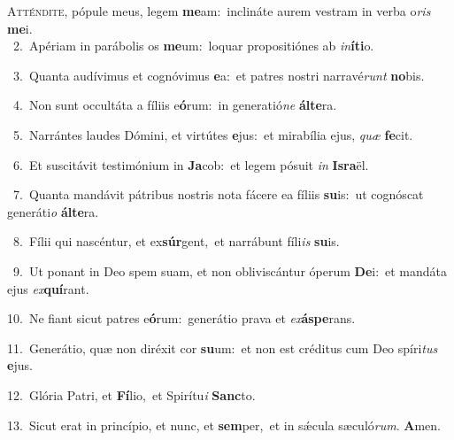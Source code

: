 \lettrine{\initial\textcolor{\initialcolor}{A}}{tténdite,} pópule meus, legem \textbf{me}\-am:~\star inclináte aurem vestram in verba o\textit{ris} \textbf{me}\-i.\\
{\numbfont\textcolor{\numbcolor}{~2.}}~Apériam in parábolis os \textbf{me}\-um:~\star loquar propositiónes ab \textit{in}\-\textbf{í}\textbf{ti}o.\par
{\numbfont\textcolor{\numbcolor}{~3.}}~Quanta audívimus et cognóvimus \textbf{e}\-a:~\star et patres nostri narravé\textit{runt} \textbf{no}\-bis.\par
{\numbfont\textcolor{\numbcolor}{~4.}}~Non sunt occultáta a fíliis e\-\textbf{ó}\-rum:~\star in generatió\textit{ne} \textbf{ál}\-\textbf{te}ra.\par
{\numbfont\textcolor{\numbcolor}{~5.}}~Narrántes laudes Dómini, et virtútes \textbf{e}\-jus:~\star et mirabília ejus, \textit{quæ} \textbf{fe}\-cit.\par
{\numbfont\textcolor{\numbcolor}{~6.}}~Et suscitávit testimónium in \textbf{Ja}\-cob:~\star et legem pósuit \textit{in} \textbf{Is}\-\textbf{ra}ël.\par
{\numbfont\textcolor{\numbcolor}{~7.}}~Quanta mandávit pátribus nostris nota fácere ea fíliis \textbf{su}\-is:~\star ut cognóscat generáti\textit{o} \textbf{ál}\-\textbf{te}ra.\par
{\numbfont\textcolor{\numbcolor}{~8.}}~Fílii qui nascéntur, et ex\-\textbf{súr}\-gent,~\star et narrábunt fíli\textit{is} \textbf{su}\-is.\par
{\numbfont\textcolor{\numbcolor}{~9.}}~Ut ponant in Deo spem suam, et non obliviscántur óperum \textbf{De}\-i:~\star et mandáta ejus \textit{ex}\-\textbf{quí}rant.\par
{\numbfont\textcolor{\numbcolor}{10.}}~Ne fiant sicut patres e\-\textbf{ó}\-rum:~\star generátio prava et \textit{ex}\-\textbf{ás}\textbf{pe}rans.\par
{\numbfont\textcolor{\numbcolor}{11.}}~Generátio, quæ non diréxit cor \textbf{su}\-um:~\star et non est créditus cum Deo spíri\textit{tus} \textbf{e}\-jus.\par
{\numbfont\textcolor{\numbcolor}{12.}}~Glória Patri, et \textbf{Fí}\-lio,~\star et Spirítu\textit{i} \textbf{Sanc}\-to.\par
{\numbfont\textcolor{\numbcolor}{13.}}~Sicut erat in princípio, et nunc, et \textbf{sem}\-per,~\star et in sǽcula sæculó\-\textit{rum}\-. \textbf{A}\-men.\par
